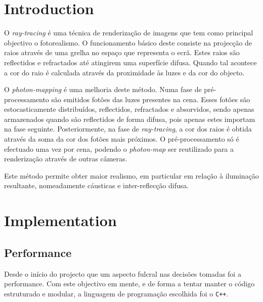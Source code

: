 \documentclass[a4paper]{article}
\title{\documentTitle}
\author{\documentAuthors{}}
\begin{document}
\renewcommand{\figurename}{Figure}
\renewcommand{\contentsname}{Contents}

\maketitle
\cleardoublepage

\tableofcontents
\cleardoublepage

\setlength{\parindent}{1cm}
\setlength{\parskip}{0.3cm}

\section{Introduction}
\indent \indent O \emph{ray-tracing} é uma técnica de renderização de imagens que tem como principal objectivo o fotorealismo.
O funcionamento básico deste consiste na projecção de raios através de uma grelha no espaço que representa o ecrã.
Estes raios são reflectidos e refractados até atingirem uma superfície difusa. Quando tal acontece a cor do raio é
calculada através da proximidade às luzes e da cor do objecto.

\indent O \emph{photon-mapping} é uma melhoria deste método. Numa fase de pré-processamento são emitidos fotões
das luzes presentes na cena. Esses fotões são estocasticamente distribuídos, reflectidos, refractados e absorvidos,
sendo apenas armazenados quando são reflectidos de forma difusa, pois apenas estes importam na fase seguinte.
Posteriormente, na fase de \emph{ray-tracing}, a cor dos raios é obtida através da soma da cor dos fotões mais próximos.
O pré-processamento só é efectuado uma vez por cena, podendo o \emph{photon-map} ser reutilizado para a renderização através de outras câmeras.

\indent Este método permite obter maior realismo, em particular em relação à iluminação resultante, nomeadamente cáusticas e inter-reflecção difusa.

\cleardoublepage
\section{Implementation}
\subsection{Performance}
\indent \indent Desde o início do projecto que um aspecto fulcral nas decisões tomadas foi a performance. Com este objectivo em mente,
e de forma a tentar manter o código estruturado e modular, a linguagem de programação escolhida foi o \texttt{C++}. 
\end{document}
